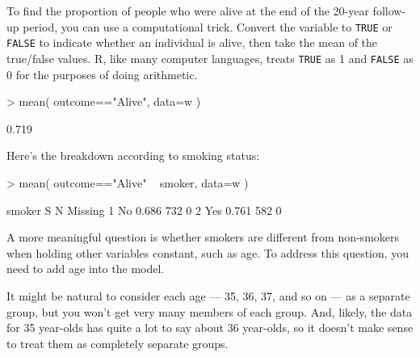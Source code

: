 To find the proportion of people who were alive at the end of the
20-year follow-up period, you can use a computational trick.  Convert
the  variable to \texttt{TRUE} or \texttt{FALSE} to
indicate whether an individual is alive, then take the mean of the
true/false values.  R, like many computer languages, treats
\texttt{TRUE} as 1 and \texttt{FALSE} as 0 for the purposes of doing arithmetic.
\begin{Schunk}
\begin{Sinput}
> mean( outcome=="Alive", data=w )
\end{Sinput}
\begin{Soutput}
[1] 0.719
\end{Soutput}
\end{Schunk}

Here's the breakdown according to smoking status:
\begin{Schunk}
\begin{Sinput}
> mean( outcome=="Alive" ~ smoker, data=w )
\end{Sinput}
\begin{Soutput}
  smoker     S   N Missing
1     No 0.686 732       0
2    Yes 0.761 582       0
\end{Soutput}
\end{Schunk}

A more meaningful question is whether smokers are different from
non-smokers when holding other variables constant, such as age.  To
address this question, you need to add age into the model.

It might be natural to consider
each age --- 35, 36, 37, and so on --- as a separate group, but you
won't get very many members of each group.  And, likely, the data for
35 year-olds has quite a lot to say about 36 year-olds, so it doesn't
make sense to treat them as completely separate groups.

